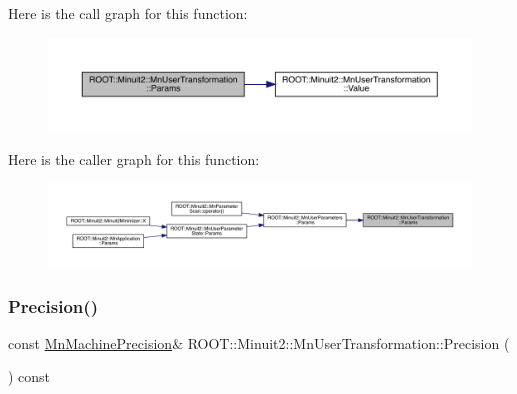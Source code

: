 Here is the call graph for this function\+:\nopagebreak
\begin{figure}[H]
\begin{center}
\leavevmode
\includegraphics[width=350pt]{d9/d98/classROOT_1_1Minuit2_1_1MnUserTransformation_a85477022b0cfb39ccfe69a46cdaffe73_cgraph}
\end{center}
\end{figure}
Here is the caller graph for this function\+:\nopagebreak
\begin{figure}[H]
\begin{center}
\leavevmode
\includegraphics[width=350pt]{d9/d98/classROOT_1_1Minuit2_1_1MnUserTransformation_a85477022b0cfb39ccfe69a46cdaffe73_icgraph}
\end{center}
\end{figure}
\mbox{\label{classROOT_1_1Minuit2_1_1MnUserTransformation_af9d893a428a4f4d94dfef1bdd3e9936e}} 
\subsubsection{\texorpdfstring{Precision()}{Precision()}\hspace{0.1cm}{\footnotesize\ttfamily [1/2]}}
{\footnotesize\ttfamily const \mbox{\hyperlink{classROOT_1_1Minuit2_1_1MnMachinePrecision}{Mn\+Machine\+Precision}}\& R\+O\+O\+T\+::\+Minuit2\+::\+Mn\+User\+Transformation\+::\+Precision (\begin{DoxyParamCaption}{ }\end{DoxyParamCaption}) const\hspace{0.3cm}{\ttfamily [inline]}}

